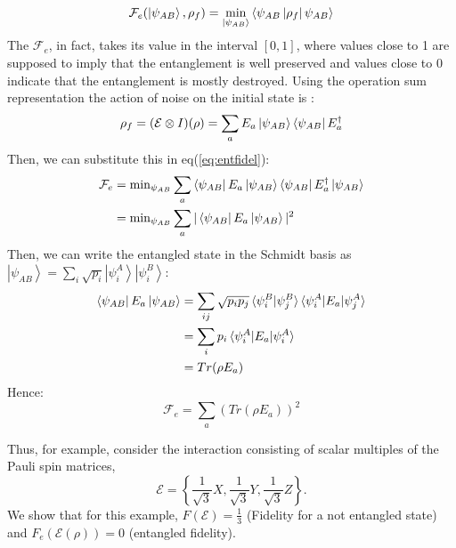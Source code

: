 \begin{equation}
\mathcal{F}_{e}(\ket{\psi_{AB}},\rho_f)=\min _{\left|\psi_{AB}\right\rangle }\left\langle\psi_{AB}\left|\rho_f\right| \psi_{AB}\right\rangle
\label{eq:entfidel}
\end{equation}
The $\mathcal{F}_e$, in fact, takes its value in the interval $[0, 1]$, where values close to 1 are supposed to imply that the entanglement is well preserved and values close to $0$ indicate that the entanglement is mostly destroyed.
Using the operation sum representation the action of noise on the initial state is :
\begin{equation*}
\rho_f=(\mathcal{E}\otimes I)(\rho)=\sum_{a} E_a\ket{\psi_{AB}}\bra{\psi_{AB}} E_a^{\dagger}\end{equation*}
Then, we can substitute this in eq(\ref{eq:entfidel}): 
\begin{align*}
    \mathcal{F}_e&=\text{min}_{\psi_{AB}} \sum_a  \bra{\psi_{AB}}E_a\ket{\psi_{AB}}\bra{\psi_{AB}} E_a^{\dagger}\ket{\psi_{AB}} \\&= \text{min}_{\psi_{AB}} \sum_a  |\bra{\psi_{AB}}E_a\ket{\psi_{AB}}|^2
\end{align*}
Then, we can write the entangled state in the Schmidt basis as $\left|\psi_{AB}\right\rangle=\sum_{i} \sqrt{p_{i}}\left|\psi_{i}^{A}\right\rangle\left|\psi_{i}^{B}\right\rangle$:
\begin{align*}
    \bra{\psi_{AB}}E_a\ket{\psi_{AB}} &= \sum_{ij} \sqrt{p_i p_j} \braket{\psi_i^B|\psi_j^B} \braket{\psi_i^A|E_a|\psi_j^A}\\ 
    &= \sum_i p_i \braket{\psi_i^A|E_a|\psi_i^A}\\
    &= Tr(\rho E_a)
\end{align*}
Hence: 
\begin{equation}
    \mathcal{F}_e = \sum_a \left(Tr(\rho E_a)\right)^2
\end{equation}

Thus, for example, consider the interaction consisting of scalar multiples of the Pauli spin matrices,
$$
\mathcal{E}=\left\{\frac{1}{\sqrt{3}} X, \frac{1}{\sqrt{3}} Y, \frac{1}{\sqrt{3}} Z\right\} .
$$
We show that for this example, $F(\mathcal{E})=\frac{1}{3}$ (Fidelity for a not entangled state) and
$F_{e}(\mathcal{E}(\rho))=0 $  (entangled fidelity).

